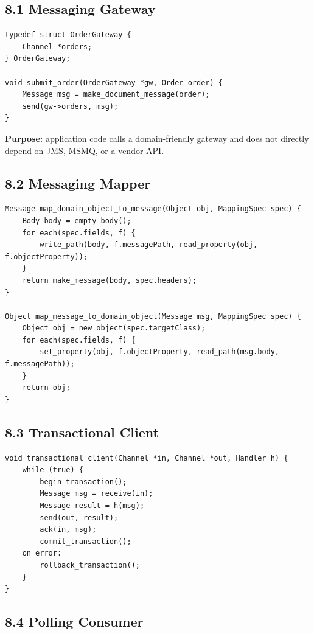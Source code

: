 \documentclass[11pt]{article}
\begin{document}
\subsection{8.1 Messaging Gateway}\label{messaging-gateway}

\begin{verbatim}
typedef struct OrderGateway {
    Channel *orders;
} OrderGateway;

void submit_order(OrderGateway *gw, Order order) {
    Message msg = make_document_message(order);
    send(gw->orders, msg);
}
\end{verbatim}

\textbf{Purpose:} application code calls a domain-friendly gateway and
does not directly depend on JMS, MSMQ, or a vendor API.

\subsection{8.2 Messaging Mapper}\label{messaging-mapper}

\begin{verbatim}
Message map_domain_object_to_message(Object obj, MappingSpec spec) {
    Body body = empty_body();
    for_each(spec.fields, f) {
        write_path(body, f.messagePath, read_property(obj, f.objectProperty));
    }
    return make_message(body, spec.headers);
}

Object map_message_to_domain_object(Message msg, MappingSpec spec) {
    Object obj = new_object(spec.targetClass);
    for_each(spec.fields, f) {
        set_property(obj, f.objectProperty, read_path(msg.body, f.messagePath));
    }
    return obj;
}
\end{verbatim}

\subsection{8.3 Transactional Client}\label{transactional-client}

\begin{verbatim}
void transactional_client(Channel *in, Channel *out, Handler h) {
    while (true) {
        begin_transaction();
        Message msg = receive(in);
        Message result = h(msg);
        send(out, result);
        ack(in, msg);
        commit_transaction();
    on_error:
        rollback_transaction();
    }
}
\end{verbatim}

\subsection{8.4 Polling Consumer}\label{polling-consumer}
\end{document}
